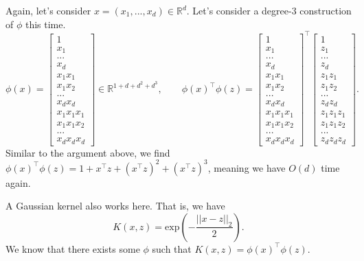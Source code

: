 \begin{example}
	Again, let's consider $x = (x_1, ..., x_d) \in \mathbb{R}^d$. Let's consider a degree-3 construction of $\phi$ this time.
	$$
	\phi(x) = \begin{bmatrix} 1 \\ x_1 \\ ... \\ x_d \\ x_1x_1 \\ x_1x_2 \\ ... \\ x_dx_d \\ x_1x_1x_1 \\ x_1x_1x_2 \\ ... \\ x_dx_dx_d \end{bmatrix} \in \mathbb{R}^{1 + d + d^2 + d^3}, \qquad \phi(x)^\top \phi(z) = \begin{bmatrix} 1 \\ x_1 \\ ... \\ x_d \\ x_1x_1 \\ x_1x_2 \\ ... \\ x_dx_d \\ x_1x_1x_1 \\ x_1x_1x_2 \\ ... \\ x_dx_dx_d \end{bmatrix}^\top \begin{bmatrix} 1 \\ z_1 \\ ... \\ z_d \\ z_1z_1 \\ z_1z_2 \\ ... \\ z_dz_d \\ z_1z_1z_1 \\ z_1z_1z_2 \\ ... \\ z_dz_dz_d \end{bmatrix}.
	$$
	Similar to the argument above, we find $\phi(x)^\top \phi(z) = 1 + x^\top z + (x^\top z)^2 + (x^\top z)^3$, meaning we have $O(d)$ time again. 
\end{example}
\begin{example}
	A Gaussian kernel also works here. That is, we have
	$$
	K(x, z) = \text{exp}\left(-\frac{||x - z||_2}{2}\right).
	$$
	We know that there exists some $\phi$ such that $K(x, z) = \phi(x)^\top \phi(z)$.
\end{example}

